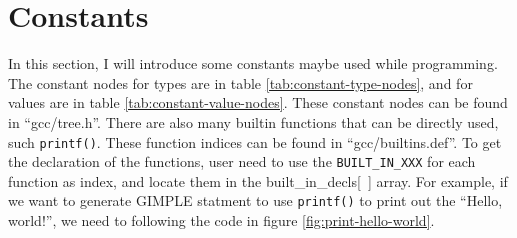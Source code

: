 \documentclass[11pt]{article}
\begin{document}
\section{Constants}
In this section, I will introduce some constants maybe used while programming. The constant nodes for types are in table \ref{tab:constant-type-nodes}, and for values are in table \ref{tab:constant-value-nodes}. These constant nodes can be found in ``gcc/tree.h''. There are also many builtin functions that can be directly used, such \texttt{printf()}. These function indices can be found in ``gcc/builtins.def''. To get the declaration of the functions, user need to use the \texttt{BUILT\_IN\_XXX} for each function as index, and locate them in the built\_in\_decls[\ ] array. For example, if we want to generate GIMPLE statment to use \texttt{printf()} to print out the ``Hello, world!'', we need to following the code in figure \ref{fig:print-hello-world}.  
\end{document}
